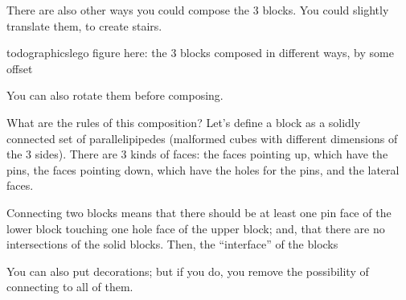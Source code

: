 There are also other ways you could compose the 3 blocks. You could slightly translate them, to create stairs.

todographics{lego figure here: the 3 blocks composed in different ways, by some offset}

You can also rotate them before composing.


What are the rules of this composition? Let's define a block as a solidly connected set of parallelipipedes (malformed cubes with different dimensions of the 3 sides). There are 3 kinds of faces: the faces pointing up, which have the pins, the faces pointing down, which have the holes for the pins, and the lateral faces.

Connecting two blocks means that there should be at least one pin face of the lower block touching one hole face of the upper block; and, that there are no intersections of the solid blocks. Then, the ``interface'' of the blocks


You can also put decorations; but if you do, you remove the possibility of connecting to all of them.


